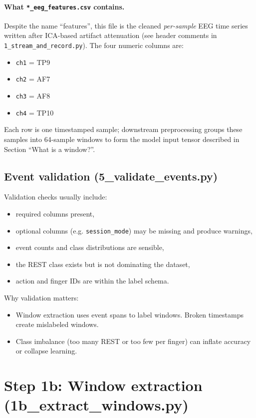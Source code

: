 \documentclass[11pt]{article}
\begin{document}
\paragraph{What \texttt{*\_eeg\_features.csv} contains.}
Despite the name ``features'', this file is the cleaned \emph{per-sample} EEG time series written after ICA-based artifact attenuation (see header comments in \texttt{1\_stream\_and\_record.py}). The four numeric columns are:

\begin{itemize}
  \item \texttt{ch1} = TP9
  \item \texttt{ch2} = AF7
  \item \texttt{ch3} = AF8
  \item \texttt{ch4} = TP10
\end{itemize}

Each row is one timestamped sample; downstream preprocessing groups these samples into 64-sample windows to form the model input tensor described in Section ``What is a window?''.

\subsection{Event validation (5\_validate\_events.py)}
Validation checks usually include:
\begin{itemize}[leftmargin=*]
\item required columns present,
\item optional columns (e.g. \texttt{session\_mode}) may be missing and produce warnings,
\item event counts and class distributions are sensible,
\item the REST class exists but is not dominating the dataset,
\item action and finger IDs are within the label schema.
\end{itemize}

Why validation matters:
\begin{itemize}[leftmargin=*]
\item Window extraction uses event spans to label windows. Broken timestamps create mislabeled windows.
\item Class imbalance (too many REST or too few per finger) can inflate accuracy or collapse learning.
\end{itemize}

\section{Step 1b: Window extraction (1b\_extract\_windows.py)}
\end{document}
